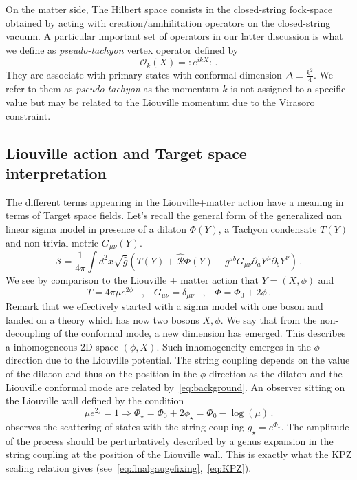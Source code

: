 \documentclass[a4paper]{article}
\def\sp{\;\;\;,\;\;\;}
\begin{document}
On the matter side, The Hilbert space consists in the closed-string fock-space obtained by acting with creation/annhilitation operators on the closed-string vacuum. A particular important set of operators in our latter discussion is what we define as \textit{pseudo-tachyon} vertex operator defined by
\begin{equation}\label{eq:pseudo-tachyon}
    \mathcal{O}_{k}(X) = :e^{i k X}:\,.
\end{equation}
They are associate with primary states with conformal dimension $\Delta=\frac{k^2}{4}$. We refer to them as \textit{pseudo-tachyon} as the momentum $k$ is not assigned to a specific value but may be related to the Liouville momentum due to the Virasoro constraint.

\subsection{Liouville action and Target space interpretation} The different terms appearing in the Liouville+matter action have a meaning in terms of Target space fields. Let's recall the general form of the generalized non linear sigma model in presence of a dilaton $\Phi(Y)$, a Tachyon condensate $T(Y)$ and non trivial metric $G_{\mu \nu}(Y)$.
\begin{equation}
  \mathcal{S} = \frac{1}{4\pi}\int d^2x \sqrt{\hat{g}}\left(T(Y)+\hat{\mathcal{R}}\Phi(Y)+g^{ab}G_{\mu \nu}\partial_a Y^\mu \partial_b Y^\nu\right)\,.
\end{equation}
We see by comparison to the Liouville + matter action that $Y = (X,\phi)$ and
\begin{equation}\label{eq:background}
  T = 4\pi \mu e^{2 \phi}\sp G_{\mu \nu} = \delta_{\mu \nu}\sp  \Phi= \Phi_0+2\phi\,. 
\end{equation}
Remark that we effectively started with a sigma model with one boson and landed on a theory which has now two bosons $X,\phi$. We say that from the non-decoupling of the conformal mode, a new dimension has emerged. This describes a inhomogeneous 2D space $(\phi,X)$. Such inhomogeneity emerges in the $\phi$ direction due to the Liouville potential. The string coupling depends on the value of the dilaton and thus on the position in the $\phi$ direction as the dilaton and the Liouville conformal mode are related by~\eqref{eq:background}. An observer sitting on the Liouville wall defined by the condition
\begin{equation}\label{eq:relationLiouvillewallcosmologicalconstant}
  \mu e^{2_\star} = 1 \Rightarrow \Phi_\star = \Phi_0 + 2\phi_\star = \Phi_0 -\log(\mu)\,.
\end{equation}
observes the scattering of states with the string coupling $g_\star = e^{\Phi_\star}$. The amplitude of the process should be perturbatively described by a genus expansion in the string coupling at the position of the Liouville wall. This is exactly what the KPZ scaling relation gives (see~\eqref{eq:finalgaugefixing},~\eqref{eq:KPZ}).
\end{document}
